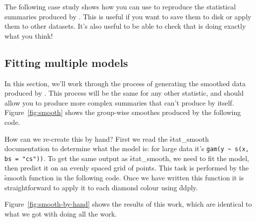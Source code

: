 The following case study shows how you can use  to reproduce the statistical summaries produced by \ggplot.  This is useful if you want to save them to disk or apply them to other datasets.  It's also useful to be able to check that \ggplot is doing exactly what you think!

\subsection{Fitting multiple models}
\label{sub:multiple_models}

In this section, we'll work through the process of generating the smoothed data produced by .  This process will be the same for any other statistic, and should allow you to produce more complex summaries that \ggplot can't produce by itself.  Figure~\ref{fig:smooth} shows the group-wise smoothes produced by the following code.  

% 


How can we re-create this by hand?  First we read the \f{stat_smooth} documentation to determine what the model is: for large data it's {\tt gam(y \verb|~| s(x, bs = "cs"))}.  To get the same output as \f{stat_smooth}, we need to fit the model, then predict it on an evenly spaced grid of points. This task is performed by the \f{smooth} function in the following code.  Once we have written this function it is straightforward to apply it to each diamond colour  using \f{ddply}. 

Figure~\ref{fig:smooth-by-hand} shows the results of this work, which are identical to what we got with \ggplot doing all the work.

% 
%   


